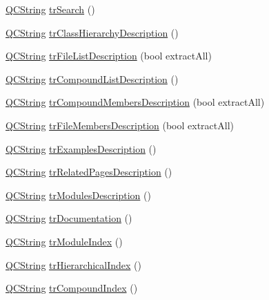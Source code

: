 \begin{DoxyCompactItemize}
\item 
\hyperlink{class_q_c_string}{Q\-C\-String} \hyperlink{class_translator_portuguese_a2f2c099d338acd273fcee72f364cb0bf}{tr\-Search} ()
\item 
\hyperlink{class_q_c_string}{Q\-C\-String} \hyperlink{class_translator_portuguese_af186dceea08383c80ad071e6e3f543ba}{tr\-Class\-Hierarchy\-Description} ()
\item 
\hyperlink{class_q_c_string}{Q\-C\-String} \hyperlink{class_translator_portuguese_a06622611a5482a239a3ceb1c3fad6fce}{tr\-File\-List\-Description} (bool extract\-All)
\item 
\hyperlink{class_q_c_string}{Q\-C\-String} \hyperlink{class_translator_portuguese_a18f7b164eb6009520c23d8af21d01567}{tr\-Compound\-List\-Description} ()
\item 
\hyperlink{class_q_c_string}{Q\-C\-String} \hyperlink{class_translator_portuguese_afba045a538c6b4cff7756d4435702631}{tr\-Compound\-Members\-Description} (bool extract\-All)
\item 
\hyperlink{class_q_c_string}{Q\-C\-String} \hyperlink{class_translator_portuguese_ad17c74cbe2208cab62912d3f2e99c351}{tr\-File\-Members\-Description} (bool extract\-All)
\item 
\hyperlink{class_q_c_string}{Q\-C\-String} \hyperlink{class_translator_portuguese_a11dd83f87e1d6ba0a6c2ef418d9ccb11}{tr\-Examples\-Description} ()
\item 
\hyperlink{class_q_c_string}{Q\-C\-String} \hyperlink{class_translator_portuguese_a4e97a46b23f0e534aa73cf4c02aebe3c}{tr\-Related\-Pages\-Description} ()
\item 
\hyperlink{class_q_c_string}{Q\-C\-String} \hyperlink{class_translator_portuguese_a5cc376e4e57f8791fa6b95f8275b5ed6}{tr\-Modules\-Description} ()
\item 
\hyperlink{class_q_c_string}{Q\-C\-String} \hyperlink{class_translator_portuguese_aae6547fd48c2b7a62503ef2466977c6f}{tr\-Documentation} ()
\item 
\hyperlink{class_q_c_string}{Q\-C\-String} \hyperlink{class_translator_portuguese_a632bc39ac817c83b74c16e63d375979b}{tr\-Module\-Index} ()
\item 
\hyperlink{class_q_c_string}{Q\-C\-String} \hyperlink{class_translator_portuguese_a0e0aeba35a42bb63680e044cf8c48310}{tr\-Hierarchical\-Index} ()
\item 
\hyperlink{class_q_c_string}{Q\-C\-String} \hyperlink{class_translator_portuguese_a0e48e1a405822c874fe32a4de9360476}{tr\-Compound\-Index} ()
\item 

\end{DoxyCompactItemize}
